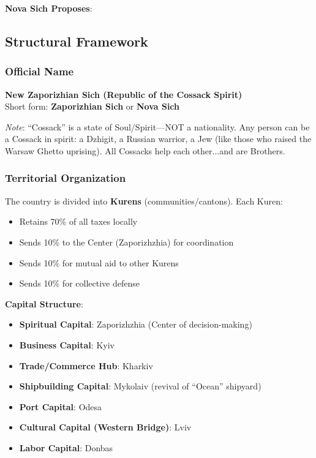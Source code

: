 \documentclass[11pt,a4paper]{article}
\theoremstyle{definition}
\theoremstyle{remark}
\begin{document}
\textbf{Nova Sich Proposes}:
\begin{center}
\end{center}

\subsection{Structural Framework}

\subsubsection{Official Name}

\textbf{New Zaporizhian Sich (Republic of the Cossack Spirit)} \\
Short form: \textbf{Zaporizhian Sich} or \textbf{Nova Sich}

\textit{Note}: ``Cossack'' is a state of Soul/Spirit—NOT a nationality. Any person can be a Cossack in spirit: a Dzhigit, a Russian warrior, a Jew (like those who raised the Warsaw Ghetto uprising). All Cossacks help each other...and are Brothers.

\subsubsection{Territorial Organization}

The country is divided into \textbf{Kurens} (communities/cantons). Each Kuren:

\begin{itemize}
\item Retains 70\% of all taxes locally
\item Sends 10\% to the Center (Zaporizhzhia) for coordination
\item Sends 10\% for mutual aid to other Kurens
\item Sends 10\% for collective defense
\end{itemize}

\textbf{Capital Structure}:
\begin{itemize}
\item \textbf{Spiritual Capital}: Zaporizhzhia (Center of decision-making)
\item \textbf{Business Capital}: Kyiv
\item \textbf{Trade/Commerce Hub}: Kharkiv
\item \textbf{Shipbuilding Capital}: Mykolaiv (revival of ``Ocean'' shipyard)
\item \textbf{Port Capital}: Odesa
\item \textbf{Cultural Capital (Western Bridge)}: Lviv
\item \textbf{Labor Capital}: Donbas
\end{itemize}
\end{document}
